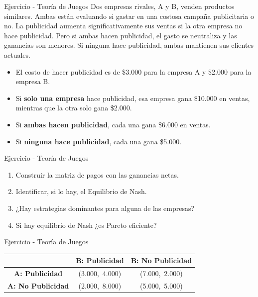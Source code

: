 \documentclass{beamer}
\begin{document}
\begin{frame}{Ejercicio - Teoría de Juegos}
Dos empresas rivales, A y B, venden productos similares. Ambas están evaluando si gastar en una costosa campaña publicitaria o no. La publicidad aumenta significativamente sus ventas si la otra empresa no hace publicidad. Pero si ambas hacen publicidad, el gasto se neutraliza y las ganancias son menores. Si ninguna hace publicidad, ambas mantienen sus clientes actuales.
    \begin{itemize}
        \item El costo de hacer publicidad es de \$3.000 para la empresa A y \$2.000 para la empresa B.
        \item Si \textbf{solo una empresa} hace publicidad, esa empresa gana \$10.000 en ventas, mientras que la otra solo gana \$2.000.
        \item Si \textbf{ambas hacen publicidad}, cada una gana \$6.000 en ventas.
        \item Si \textbf{ninguna hace publicidad}, cada una gana \$5.000.
    \end{itemize}
\end{frame}

\begin{frame}{Ejercicio - Teoría de Juegos}
\begin{enumerate}
    \item Construir la matriz de pagos con las ganancias netas.
    \item Identificar, si lo hay, el Equilibrio de Nash.
    \item ¿Hay estrategias dominantes para alguna de las empresas?
    \item Si hay equilibrio de Nash ¿es Pareto eficiente?
\end{enumerate}
\end{frame}

\begin{frame}{Ejercicio - Teoría de Juegos}
\begin{center}
\renewcommand{\arraystretch}{1.8} %
\begin{tabular}{c|c|c}
 & \textbf{B: Publicidad} & \textbf{B: No Publicidad} \\
\hline
\textbf{A: Publicidad} & (3.000,\ 4.000) & (7.000,\ 2.000) \\
\textbf{A: No Publicidad} & (2.000,\ 8.000) & (5.000,\ 5.000) \\
\end{tabular}
\end{center}
\end{frame}
\end{document}
